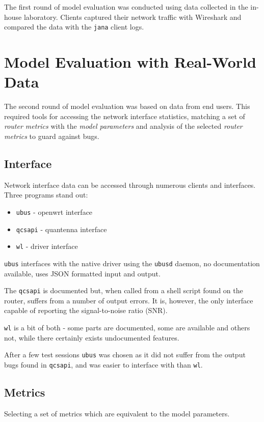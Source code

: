 The first round of model evaluation was conducted using data collected in the in-house laboratory. Clients captured their network traffic with Wireshark and compared the data with the \texttt{jana} client logs.

\section{Model Evaluation with Real-World Data}

The second round of model evaluation was based on data from end users. This required tools for accessing the network interface statistics, matching a set of \emph{router metrics} with the \emph{model parameters} and analysis of the selected \emph{router metrics} to guard against bugs.

\subsection{Interface}

Network interface data can be accessed through numerous clients and interfaces.
Three programs stand out:

\begin{itemize}
	\item \texttt{ubus} - openwrt interface
	\item \texttt{qcsapi} - quantenna interface
	\item \texttt{wl} - driver interface
\end{itemize}

\texttt{ubus} interfaces with the native driver using the \texttt{ubusd} daemon, no documentation available, uses JSON formatted input and output.

The \texttt{qcsapi} is documented but, when called from a shell script found on the router, suffers from a number of output errors. It is, however, the only interface capable of reporting the signal-to-noise ratio (SNR).

\texttt{wl} is a bit of both - some parts are documented, some are available and
others not, while there certainly exists undocumented features.

After a few test sessions \texttt{ubus} was chosen as it did not suffer from the output bugs found in \texttt{qcsapi}, and was easier to interface with than \texttt{wl}.

\subsection{Metrics}
Selecting a set of metrics which are equivalent to the model parameters.

